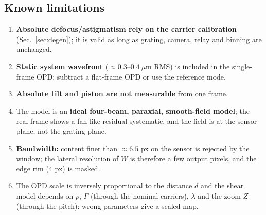 \documentclass[11pt,a4paper]{article}
\theoremstyle{definition}
\begin{document}
\subsection{Known limitations}
\begin{enumerate}
\item \textbf{Absolute defocus/astigmatism rely on the carrier calibration} (Sec.~\ref{sec:degen}); it is valid as long as grating, camera, relay and binning are unchanged.
\item \textbf{Static system wavefront} ($\approx0.3$--$0.4\ \mu$m RMS) is included in the single-frame OPD; subtract a flat-frame OPD or use the reference mode.
\item \textbf{Absolute tilt and piston are not measurable} from one frame.
\item The model is an \textbf{ideal four-beam, paraxial, smooth-field model}; the real frame shows a fan-like residual systematic, and the field is at the sensor plane, not the grating plane.
\item \textbf{Bandwidth:} content finer than $\approx6.5$ px on the sensor is rejected by the window; the lateral resolution of $W$ is therefore a few output pixels, and the edge rim ($4$ px) is masked.
\item The OPD scale is inversely proportional to the distance $d$ and the shear model depends on $p$, $\Gamma$ (through the nominal carriers), $\lambda$ and the zoom $Z$ (through the pitch): wrong parameters give a scaled map.
\end{enumerate}

\appendix
\end{document}
